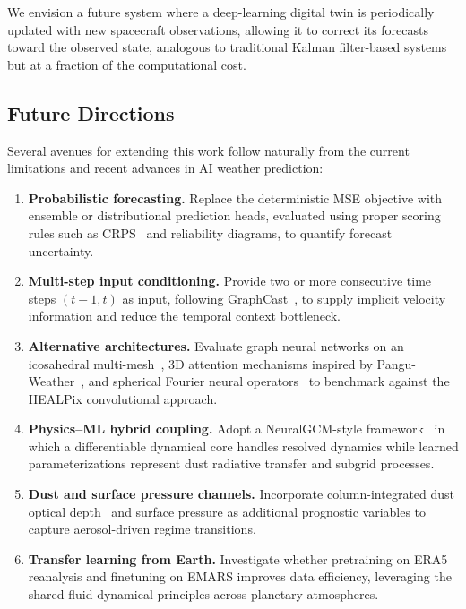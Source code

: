 \documentclass[11pt, a4paper, twocolumn]{article}
\begin{document}
We envision a future system where a deep-learning digital twin is periodically updated with new spacecraft observations, allowing it to correct its forecasts toward the observed state, analogous to traditional Kalman filter-based systems but at a fraction of the computational cost.

\subsection{Future Directions}
\label{sec:future}

Several avenues for extending this work follow naturally from the current limitations and recent advances in AI weather prediction:

\begin{enumerate}
    \item \textbf{Probabilistic forecasting.} Replace the deterministic MSE objective with ensemble or distributional prediction heads, evaluated using proper scoring rules such as CRPS~\cite{gneiting2007} and reliability diagrams, to quantify forecast uncertainty.

    \item \textbf{Multi-step input conditioning.} Provide two or more consecutive time steps $(t{-}1, t)$ as input, following GraphCast~\cite{lam2023graphcast}, to supply implicit velocity information and reduce the temporal context bottleneck.

    \item \textbf{Alternative architectures.} Evaluate graph neural networks on an icosahedral multi-mesh~\cite{keisler2022}, 3D attention mechanisms inspired by Pangu-Weather~\cite{bi2023pangu}, and spherical Fourier neural operators~\cite{bonev2023spherical} to benchmark against the HEALPix convolutional approach.

    \item \textbf{Physics--ML hybrid coupling.} Adopt a NeuralGCM-style framework~\cite{kochkov2024neuralgcm} in which a differentiable dynamical core handles resolved dynamics while learned parameterizations represent dust radiative transfer and subgrid processes.

    \item \textbf{Dust and surface pressure channels.} Incorporate column-integrated dust optical depth~\cite{montabone2015eight} and surface pressure as additional prognostic variables to capture aerosol-driven regime transitions.

    \item \textbf{Transfer learning from Earth.} Investigate whether pretraining on ERA5 reanalysis and finetuning on EMARS improves data efficiency, leveraging the shared fluid-dynamical principles across planetary atmospheres.


\end{enumerate}
\end{document}

